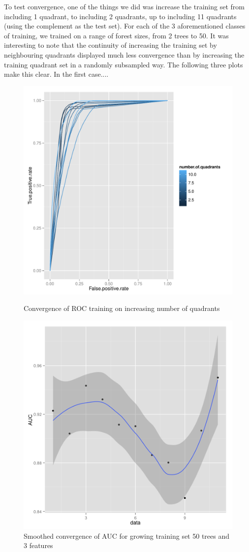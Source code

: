 \documentclass{article}\usepackage[]{graphicx}\usepackage[]{color}
\begin{document}
 To test convergence, one of the things we did was increase the training set from including 1 quadrant, to including 2 quadrants, up to including 11 quadrants (using the complement as the test set).  For each of the 3 aforementioned classes of training, we trained on a range of forest sizes, from 2 trees to 50. It was interesting to note that the continuity of increasing the training set by neighbouring quadrants displayed much less convergence than by increasing the training quadrant set in a randomly subsampled way.  The following three plots make this clear.  In the first case....\\

\begin{figure}[H]
  \includegraphics[width=\linewidth, height = 180pts]{ROC_converge1.pdf}
    \caption{Convergence of ROC training on increasing number of quadrants}\label{}
\endminipage
{}

\includegraphics[width=\linewidth, height = 180pts]{AUCconverge.png}
  \caption{Smoothed convergence of AUC for growing training set 50 trees and 3 features}\label{}
\endminipage

  \end{figure}
  
\end{document}
